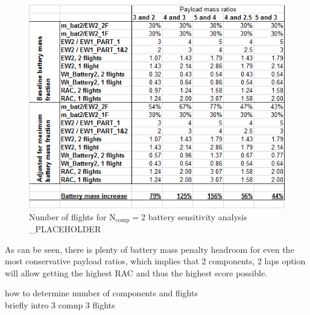 \begin{figure}[!h]
    \centering
    \includegraphics{sens_config}
    \caption{Number of flights for $\text{N}_{\text{comp}} = 2$ battery sensitivity analysis \_PLACEHOLDER }
    \label{fig:sens_config}
\end{figure}



As can be seen, there is plenty of battery mass penalty headroom for even the most conservative payload ratios, which implies that 2 components, 2 laps option will allow getting the highest RAC and thus the highest score possible.

how to determine number of components and flights\\



briefly intro 3 comnp 3 flights\\


